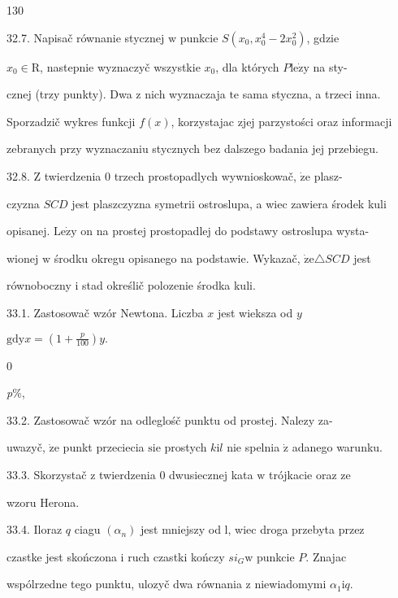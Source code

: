 \documentclass[a4paper,12pt]{article}
\begin{document}
130

32.7. Napisač równanie stycznej $\mathrm{w}$ punkcie $S(x_{0},x_{0}^{4}-2x_{0}^{2})$, gdzie

$x_{0} \in \mathrm{R}$, nastepnie wyznaczyč wszystkie $x_{0}$, dla których $P \mathrm{l}\mathrm{e}\dot{\mathrm{z}}\mathrm{y}$ na sty-

cznej (trzy punkty). Dwa $\mathrm{z}$ nich wyznaczaja $\mathrm{t}\mathrm{e}$ sama styczna, a trzeci inna.

Sporzadzič wykres funkcji $f(x)$, korzystajac zjej parzystości oraz informacji

zebranych przy wyznaczaniu stycznych bez dalszego badania jej przebiegu.

32.8. $\mathrm{Z}$ twierdzenia $0$ trzech prostopadlych wywnioskowač, $\dot{\mathrm{z}}\mathrm{e}$ plasz-

czyzna $SCD$ jest plaszczyzna symetrii ostroslupa, a wiec zawiera środek kuli

opisanej. $\mathrm{L}\mathrm{e}\dot{\mathrm{z}}\mathrm{y}$ on na prostej prostopadlej do podstawy ostroslupa wysta-

wionej $\mathrm{w}$ środku okregu opisanego na podstawie. Wykazač, $\dot{\mathrm{z}}\mathrm{e}\triangle SCD$ jest

równoboczny $\mathrm{i}$ stad określič polozenie środka kuli.

33.1. Zastosowač wzór Newtona. Liczba $x$ jest wieksza od $y$

$\mathrm{g}\mathrm{d}\mathrm{y}x= (1+\displaystyle \frac{p}{100})y.$

0

{\it p}\%,

33.2. Zastosowač wzór na odleglośč punktu od prostej. Nalezy za-

uwazyč, $\dot{\mathrm{z}}\mathrm{e}$ punkt przeciecia $\mathrm{s}\mathrm{i}\mathrm{e}$ prostych $k\mathrm{i}l$ nie spelnia $\dot{\mathrm{z}}$ adanego warunku.

33.3. Skorzystač $\mathrm{z}$ twierdzenia $0$ dwusiecznej kata $\mathrm{w}$ trójkacie oraz ze

wzoru Herona.

33.4. Iloraz $q$ ciagu $(\alpha_{n})$ jest mniejszy od l, wiec droga przebyta przez

czastke jest skończona $\mathrm{i}$ ruch czastki kończy $si_{G} \mathrm{w}$ punkcie $P$. Znajac

wspólrzedne tego punktu, ulozyč dwa równania $\mathrm{z}$ niewiadomymi $\alpha_{1}\mathrm{i}q.$
\end{document}
